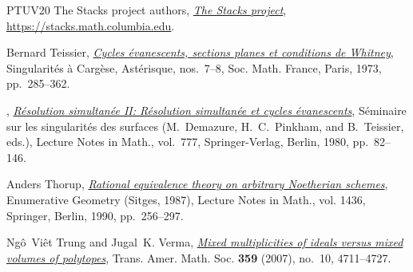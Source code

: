 \documentclass[a4paper, 11pt]{amsart}
\theoremstyle{definition}
\begin{document}
\begin{thebibliography}{PTUV20}
		The {Stacks project authors}, \emph{\href{https://stacks.math.columbia.edu}{The
				Stacks project}}, \url{https://stacks.math.columbia.edu}.
		
		Bernard Teissier,
		\emph{\href{https://numdam.org/item/AST_1973__7-8__285_0/}{Cycles
				\'evanescents, sections planes et conditions de Whitney}},
		Singularit\'es \`a Carg\`ese, Ast\'erisque, nos.~7--8,
		Soc. Math. France, Paris, 1973, pp.~285--362.
		
		\bysame, \emph{\href{https://doi.org/10.1007/BFb0085881}{R\'esolution
				simultan\'ee II: R\'esolution simultan\'ee et cycles \'evanescents}},
		S\'eminaire sur les singularit\'es des surfaces (M.~Demazure,
		H.~C.~Pinkham, and B.~Teissier, eds.), Lecture Notes in Math., vol.~777,
		Springer-Verlag, Berlin, 1980, pp.~82--146.
		
		Anders Thorup, \emph{\href{https://doi.org/10.1007/BFb0084049}{Rational
				equivalence theory on arbitrary Noetherian schemes}}, Enumerative Geometry
		(Sitges, 1987), Lecture Notes in Math., vol. 1436, Springer, Berlin, 1990,
		pp.~256--297.
		
		Ng{\^o}~Vi{\^e}t Trung and Jugal~K. Verma,
		\emph{\href{https://doi.org/10.1090/S0002-9947-07-04054-8}{Mixed
				multiplicities of ideals versus mixed volumes of polytopes}},
		Trans. Amer. Math. Soc. \textbf{359} (2007), no.~10, 4711--4727.
		
	\end{thebibliography}
	
\end{document}
